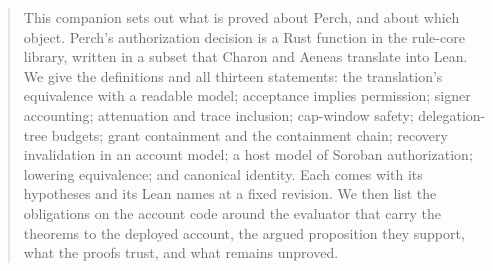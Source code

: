 \begin{abstract}
This companion sets out what is proved about Perch, and about which object.
Perch's authorization decision is a Rust function in the rule-core library,
written in a subset that Charon and Aeneas translate into Lean. We give the
definitions and all thirteen statements: the translation's equivalence with a
readable model; acceptance implies permission; signer accounting; attenuation
and trace inclusion; cap-window safety; delegation-tree budgets; grant
containment and the containment chain; recovery invalidation in an account
model; a host model of Soroban authorization; lowering equivalence; and
canonical identity. Each comes with its hypotheses and its Lean names at a fixed
revision. We then list the obligations on the account code around the evaluator
that carry the theorems to the deployed account, the argued proposition they support, what the proofs trust,
and what remains unproved.
\end{abstract}
